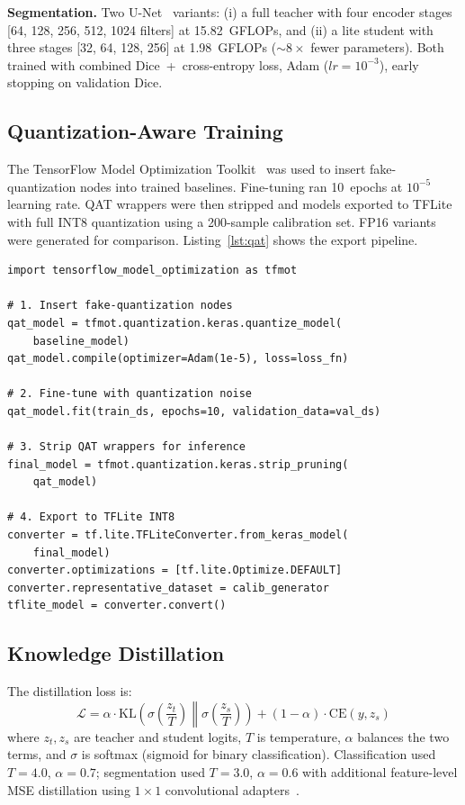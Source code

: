 \documentclass[10pt,twocolumn]{article}
\begin{document}
\textbf{Segmentation.} Two U-Net~\citep{ronneberger2015unet} variants: (i) a full teacher with four encoder stages [64, 128, 256, 512, 1024 filters] at 15.82~GFLOPs, and (ii) a lite student with three stages [32, 64, 128, 256] at 1.98~GFLOPs (${\sim}8{\times}$ fewer parameters). Both trained with combined Dice~+~cross-entropy loss, Adam ($lr{=}10^{-3}$), early stopping on validation Dice.

\subsection{Quantization-Aware Training}

The TensorFlow Model Optimization Toolkit~\citep{tfmot2023} was used to insert fake-quantization nodes into trained baselines. Fine-tuning ran 10~epochs at $10^{-5}$ learning rate. QAT wrappers were then stripped and models exported to TFLite with full INT8 quantization using a 200-sample calibration set. FP16 variants were generated for comparison. Listing~\ref{lst:qat} shows the export pipeline.

\begin{lstlisting}[caption={QAT pipeline: wrap, fine-tune, strip, export (\texttt{compression/qat.py}).},label=lst:qat]
import tensorflow_model_optimization as tfmot

# 1. Insert fake-quantization nodes
qat_model = tfmot.quantization.keras.quantize_model(
    baseline_model)
qat_model.compile(optimizer=Adam(1e-5), loss=loss_fn)

# 2. Fine-tune with quantization noise
qat_model.fit(train_ds, epochs=10, validation_data=val_ds)

# 3. Strip QAT wrappers for inference
final_model = tfmot.quantization.keras.strip_pruning(
    qat_model)

# 4. Export to TFLite INT8
converter = tf.lite.TFLiteConverter.from_keras_model(
    final_model)
converter.optimizations = [tf.lite.Optimize.DEFAULT]
converter.representative_dataset = calib_generator
tflite_model = converter.convert()
\end{lstlisting}

\subsection{Knowledge Distillation}

The distillation loss is:
\begin{equation}
\mathcal{L} = \alpha \cdot \mathrm{KL}\!\left(\sigma\!\left(\frac{z_t}{T}\right) \middle\| \sigma\!\left(\frac{z_s}{T}\right)\right) + (1{-}\alpha) \cdot \mathrm{CE}(y, z_s)
\label{eq:kd_loss}
\end{equation}
where $z_t, z_s$ are teacher and student logits, $T$ is temperature, $\alpha$ balances the two terms, and $\sigma$ is softmax (sigmoid for binary classification). Classification used $T{=}4.0$, $\alpha{=}0.7$; segmentation used $T{=}3.0$, $\alpha{=}0.6$ with additional feature-level MSE distillation using $1{\times}1$ convolutional adapters~\citep{romero2015fitnets}.
\end{document}
